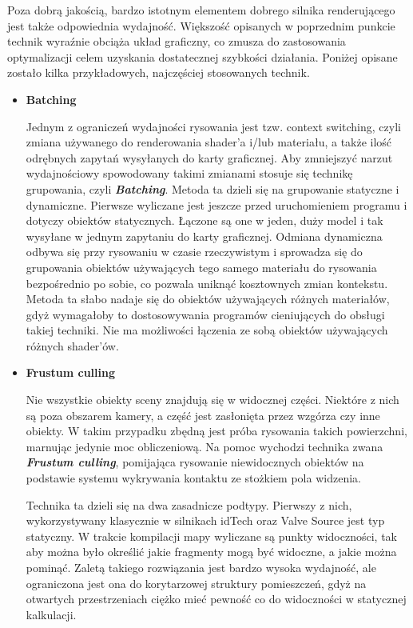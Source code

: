Poza dobrą jakością, bardzo istotnym elementem dobrego silnika renderującego jest także odpowiednia wydajność. Większość opisanych w poprzednim punkcie technik wyraźnie obciąża układ graficzny, co zmusza do zastosowania optymalizacji celem uzyskania dostatecznej szybkości działania. Poniżej opisane zostało kilka przykładowych, najczęściej stosowanych technik.

\begin{itemize}
	\item \textbf{Batching}

	Jednym z ograniczeń wydajności rysowania jest tzw. context switching, czyli zmiana używanego do renderowania shader'a i/lub materiału, a także ilość odrębnych zapytań wysyłanych do karty graficznej. Aby zmniejszyć narzut wydajnościowy spowodowany takimi zmianami stosuje się technikę grupowania, czyli \emph{\textbf{Batching}}.
	Metoda ta dzieli się na grupowanie statyczne i dynamiczne. Pierwsze wyliczane jest jeszcze przed uruchomieniem programu i dotyczy obiektów statycznych. Łączone są one w jeden, duży model i tak wysyłane w jednym zapytaniu do karty graficznej. Odmiana dynamiczna odbywa się przy rysowaniu w czasie rzeczywistym i sprowadza się do grupowania obiektów używających tego samego materiału do rysowania bezpośrednio po sobie, co pozwala uniknąć kosztownych zmian kontekstu. Metoda ta słabo nadaje się do obiektów używających różnych materiałów, gdyż wymagałoby to dostosowywania programów cieniujących do obsługi takiej techniki. Nie ma możliwości łączenia ze sobą obiektów używających różnych shader'ów.

	\item \textbf{Frustum culling}

	Nie wszystkie obiekty sceny znajdują się w widocznej części. Niektóre z nich są poza obszarem kamery, a część jest zasłonięta przez wzgórza czy inne obiekty. W takim przypadku zbędną jest próba rysowania takich powierzchni, marnując jedynie moc obliczeniową. Na pomoc wychodzi technika zwana \emph{\textbf{Frustum culling}}, pomijająca rysowanie niewidocznych obiektów na podstawie systemu wykrywania kontaktu ze stożkiem pola widzenia.
	
	Technika ta dzieli się na dwa zasadnicze podtypy. Pierwszy z nich, wykorzystywany klasycznie w silnikach idTech oraz Valve Source jest typ statyczny. W trakcie kompilacji mapy wyliczane są punkty widoczności, tak aby można było określić jakie fragmenty mogą być widoczne, a jakie można pominąć. Zaletą takiego rozwiązania jest bardzo wysoka wydajność, ale ograniczona jest ona do korytarzowej struktury pomieszczeń, gdyż na otwartych przestrzeniach ciężko mieć pewność co do widoczności w statycznej kalkulacji.
	

\end{itemize}
